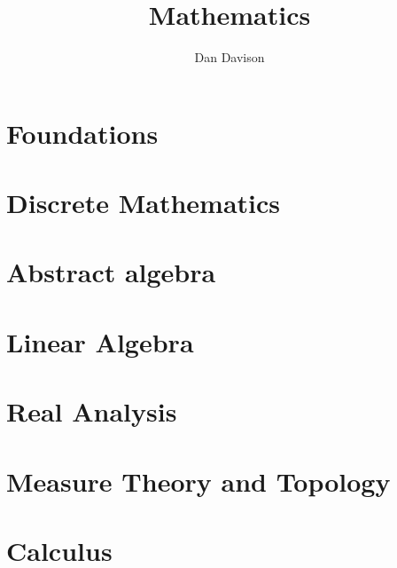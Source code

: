 \documentclass{book}
\title{Mathematics}
\author{Dan Davison}
\begin{document}
\frontmatter
\maketitle
\tableofcontents
\mainmatter


\chapter{Foundations}



\chapter{Discrete Mathematics}


\chapter{Abstract algebra}


\chapter{Linear Algebra}




\chapter{Real Analysis}


\chapter{Measure Theory and Topology}

















\chapter{Calculus}






\end{document}
